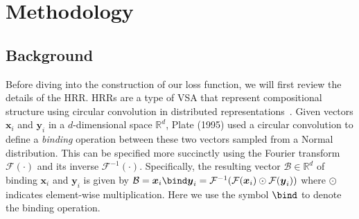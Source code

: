 \documentclass[letterpaper]{article} %
\begin{document}
\section{Methodology} \label{sec:method}


\subsection{Background}
Before diving into the construction of our loss function, we will first review the details of the HRR. HRRs are a type of VSA that represent compositional structure using circular convolution in distributed representations~\cite{b2}. Given vectors $\boldsymbol{x}_i$ and $\boldsymbol{y}_i$ in a $d$-dimensional space $\mathbb{R}^d$, Plate (1995) used a circular convolution to define a \emph{binding} operation between these two vectors sampled from a Normal distribution. This can be specified more succinctly using the Fourier transform $\mathcal{F}(\cdot)$ and its inverse $\mathcal{F}^{-1}(\cdot)$. Specifically, the resulting vector $\mathcal{B} \in \mathbb{R}^d$ of binding $\boldsymbol{x}_i$ and $\boldsymbol{y}_i$ is given by
$\mathcal{B} = \boldsymbol{x}_i \bind \boldsymbol{y}_i = \mathcal{F}^{-1}(\mathcal{F}(\boldsymbol{x}_i) \odot \mathcal{F}(\boldsymbol{y}_i))$
where $\odot$ indicates element-wise multiplication.
Here we use the symbol $\bind $ to denote the binding operation.
\end{document}
